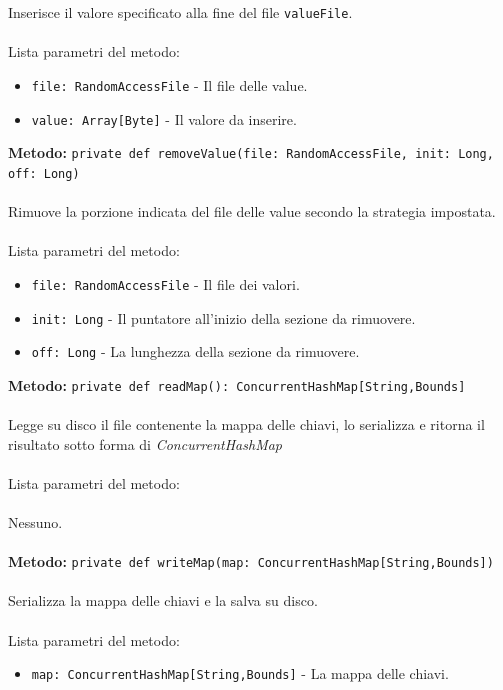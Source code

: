 \documentclass[a4paper]{article}
\begin{document}
		Inserisce il valore specificato alla fine del file \texttt{valueFile}.
		\\ \\
		Lista parametri del metodo:
		\begin{itemize}
			\item \texttt{file: RandomAccessFile} - Il file delle value.
			\item \texttt{value: Array[Byte]} - Il valore da inserire.
		\end{itemize}
		\textbf{Metodo:} \texttt{private def removeValue(file: RandomAccessFile, init: Long, off: Long)}
		\\ \\
		Rimuove la porzione indicata del file delle value secondo la strategia impostata.
		\\ \\
		Lista parametri del metodo:
		\begin{itemize}
			\item \texttt{file: RandomAccessFile} - Il file dei valori.
			\item \texttt{init: Long} - Il puntatore all'inizio della sezione da rimuovere.
			\item \texttt{off: Long} - La lunghezza della sezione da rimuovere.
		\end{itemize}
		\textbf{Metodo:} \texttt{private def readMap(): ConcurrentHashMap[String,Bounds]}
		\\ \\
		Legge su disco il file contenente la mappa delle chiavi, lo serializza e ritorna il risultato sotto forma di \emph{ConcurrentHashMap}
		\\ \\
		Lista parametri del metodo:
		\\ \\
		Nessuno.
		\\ \\
		\textbf{Metodo:} \texttt{private def writeMap(map: ConcurrentHashMap[String,Bounds])}
		\\ \\
		Serializza la mappa delle chiavi e la salva su disco.
		\\ \\
		Lista parametri del metodo:
		\begin{itemize}
			\item \texttt{map: ConcurrentHashMap[String,Bounds]} - La mappa delle chiavi.
		\end{itemize}
		
\end{document}
